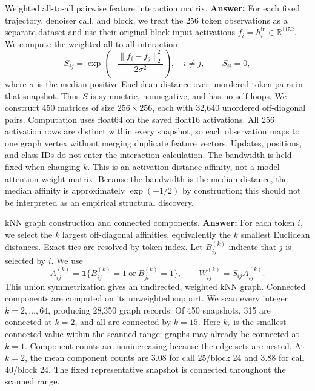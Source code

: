 
\item Weighted all-to-all pairwise feature interaction matrix.
{\color{blue}\textbf{Answer:}
For each fixed trajectory, denoiser call, and block, we treat the 256 token observations
as a separate dataset and use their original block-input activations
$f_i=h_i^{\mathrm{in}}\in\mathbb R^{1152}$. We compute the weighted all-to-all interaction
\[
S_{ij}=\exp\!\left(-\frac{\|f_i-f_j\|_2^2}{2\sigma^2}\right),\quad i\ne j,
\qquad S_{ii}=0,
\]
where $\sigma$ is the median positive Euclidean distance over unordered token pairs
in that snapshot. Thus $S$ is symmetric, nonnegative, and has no self-loops.
We construct 450 matrices of size $256\times256$, each with 32,640 unordered
off-diagonal pairs. Computation uses float64 on the saved float16 activations.
All 256 activation rows are distinct within every snapshot, so each observation
maps to one graph vertex without merging duplicate feature vectors.
Updates, positions, and class IDs do not enter the interaction calculation.
The bandwidth is held fixed when changing $k$. This is an activation-distance
affinity, not a model attention-weight matrix. Because the bandwidth is the
median distance, the median affinity is approximately $\exp(-1/2)$ by construction;
this should not be interpreted as an empirical structural discovery.
}


\item kNN graph construction and connected components.
{\color{blue}\textbf{Answer:}
For each token $i$, we select the $k$ largest off-diagonal affinities,
equivalently the $k$ smallest Euclidean distances. Exact ties are resolved by
token index. Let $B_{ij}^{(k)}$ indicate that $j$ is selected by $i$. We use
\[
A_{ij}^{(k)}=\mathbf{1}\{B_{ij}^{(k)}=1\ \mathrm{or}\ B_{ji}^{(k)}=1\},
\qquad W_{ij}^{(k)}=S_{ij}A_{ij}^{(k)}.
\]
This union symmetrization gives an undirected, weighted kNN graph. Connected
components are computed on its unweighted support. We scan every integer
$k=2,\ldots,64$, producing 28,350 graph records. Of 450 snapshots,
315 are connected at $k=2$, and all are connected by $k=15$.
Here $k_c$ is the smallest connected value within the scanned range; graphs may
already be connected at $k=1$. Component counts are nonincreasing because the
edge sets are nested. At $k=2$, the mean component counts are 3.08 for call 25/block 24
and 3.88 for call 40/block 24. The fixed representative snapshot is connected
throughout the scanned range.
}


